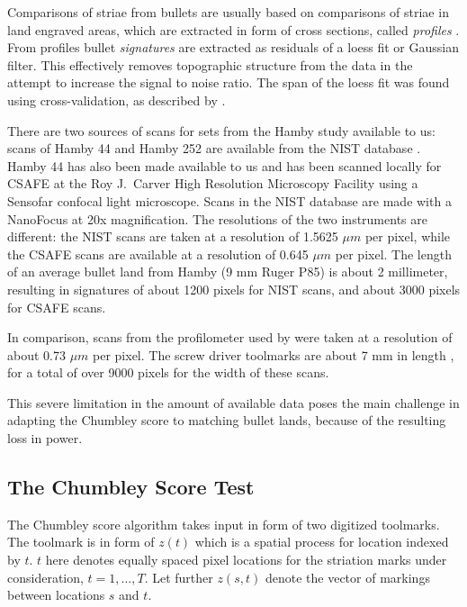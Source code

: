 \documentclass[12pt]{article}
\begin{document}
Comparisons of striae from bullets are usually based on comparisons of
striae in land engraved areas, which are extracted in form of cross
sections, called \emph{profiles} \citep{aoas,ma2004}. From profiles
bullet \emph{signatures} \citep{chu2013,aoas} are extracted as residuals
of a loess fit or Gaussian filter. This effectively removes topographic
structure from the data in the attempt to increase the signal to noise
ratio. The span of the loess fit was found using cross-validation, as
described by \citet{aoas}.

There are two sources of scans for sets from the Hamby study available
to us: scans of Hamby 44 and Hamby 252 are available from the NIST
database \citep{nist}. Hamby 44 has also been made available to us and
has been scanned locally for CSAFE at the Roy J.~Carver High Resolution
Microscopy Facility using a Sensofar confocal light microscope. Scans in
the NIST database are made with a NanoFocus at 20x magnification. The
resolutions of the two instruments are different: the NIST scans are
taken at a resolution of 1.5625 \(\mu m\) per pixel, while the CSAFE
scans are available at a resolution of 0.645 \(\mu m\) per pixel. The
length of an average bullet land from Hamby (9 mm Ruger P85) is about 2
millimeter, resulting in signatures of about 1200 pixels for NIST scans,
and about 3000 pixels for CSAFE scans.

In comparison, scans from the profilometer used by
\citet{chumbley, hadler} were taken at a resolution of about 0.73
\(\mu m\) per pixel. The screw driver toolmarks are about 7 mm in length
\citep{manytoolmarks1}, for a total of over 9000 pixels for the width of
these scans.

This severe limitation in the amount of available data poses the main
challenge in adapting the Chumbley score to matching bullet lands,
because of the resulting loss in power.

\subsection{The Chumbley Score Test}\label{the-chumbley-score-test}

The Chumbley score algorithm takes input in form of two digitized
toolmarks. The toolmark is in form of \(z(t)\) which is a spatial
process for location indexed by \(t\). \(t\) here denotes equally spaced
pixel locations for the striation marks under consideration,
\(t = 1, ..., T\). Let further \(z(s,t)\) denote the vector of markings
between locations \(s\) and \(t\).
\end{document}
